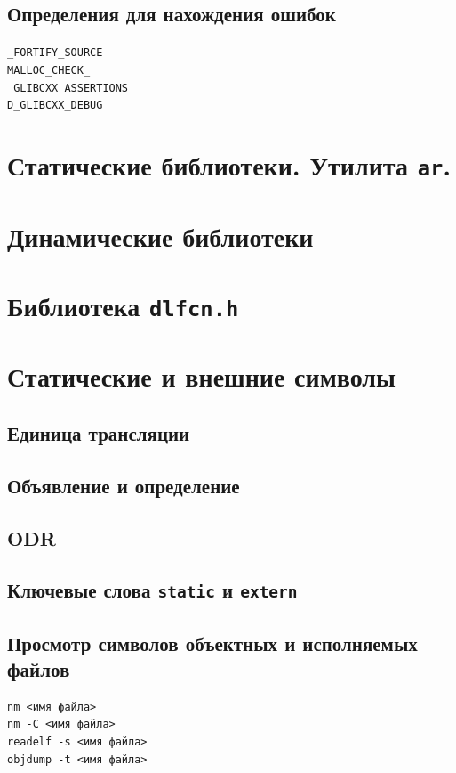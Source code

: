 \documentclass{article}
\begin{document}
\subsection*{Определения для нахождения ошибок}
\texttt{\_FORTIFY\_SOURCE}\\
\texttt{MALLOC\_CHECK\_}\\
\texttt{\_GLIBCXX\_ASSERTIONS}\\
\texttt{D\_GLIBCXX\_DEBUG} 

\newpage
\section{Статические библиотеки. Утилита \texttt{ar}.}

\section{Динамические библиотеки}


\section{Библиотека \texttt{dlfcn.h}}


\section{Статические и внешние символы}
\subsection*{Единица трансляции}
\subsection*{Объявление и определение}
\subsection*{ODR}
\subsection*{Ключевые слова \texttt{static} и \texttt{extern}}

\subsection*{Просмотр символов объектных и исполняемых файлов}
\begin{verbatim}
nm <имя файла>
nm -C <имя файла>
readelf -s <имя файла>
objdump -t <имя файла>
\end{verbatim}
\end{document}
